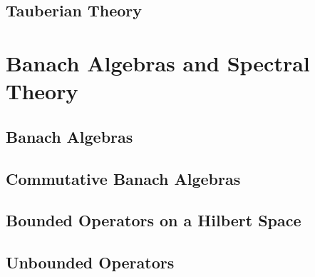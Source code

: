 \documentclass[oneside]{amsbook}
\numberwithin{ex}{chapter}
\begin{document}
\chapter{Tauberian Theory}


\part{Banach Algebras and Spectral Theory}
\chapter{Banach Algebras}

\chapter{Commutative Banach Algebras}

\chapter{Bounded Operators on a Hilbert Space}

\chapter{Unbounded Operators}

\end{document}
